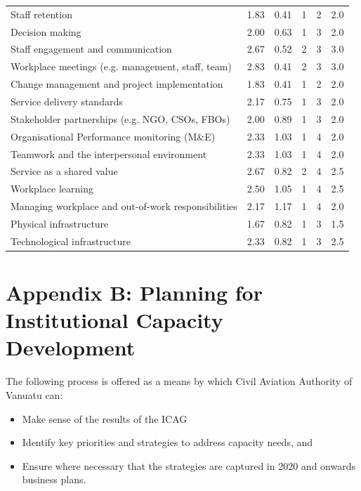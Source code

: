 \documentclass[
  10pt,
]{report}
\providecommand{\tightlist}{%
  \setlength{\itemsep}{0pt}\setlength{\parskip}{0pt}}
\begin{document}
\begin{longtable}[t]{>{\raggedright\arraybackslash}p{6cm}rrrrr}
Staff retention & 1.83 & 0.41 & 1 & 2 & 2.0\\
Decision making & 2.00 & 0.63 & 1 & 3 & 2.0\\
Staff engagement and communication & 2.67 & 0.52 & 2 & 3 & 3.0\\
\addlinespace
Workplace meetings (e.g. management, staff, team) & 2.83 & 0.41 & 2 & 3 & 3.0\\
Change management and project implementation & 1.83 & 0.41 & 1 & 2 & 2.0\\
Service delivery standards & 2.17 & 0.75 & 1 & 3 & 2.0\\
Stakeholder partnerships (e.g. NGO, CSOs, FBOs) & 2.00 & 0.89 & 1 & 3 & 2.0\\
Organisational Performance monitoring (M\&E) & 2.33 & 1.03 & 1 & 4 & 2.0\\
\addlinespace
Teamwork and the interpersonal environment & 2.33 & 1.03 & 1 & 4 & 2.0\\
Service as a shared value & 2.67 & 0.82 & 2 & 4 & 2.5\\
Workplace learning & 2.50 & 1.05 & 1 & 4 & 2.5\\
Managing workplace and out-of-work responsibilities & 2.17 & 1.17 & 1 & 4 & 2.0\\
Physical infrastructure & 1.67 & 0.82 & 1 & 3 & 1.5\\
\addlinespace
Technological infrastructure & 2.33 & 0.82 & 1 & 3 & 2.5\\
\bottomrule

\end{longtable}

\endgroup{}

\chapter{Appendix B: Planning for Institutional Capacity
Development}\label{appendix-b-planning-for-institutional-capacity-development}

The following process is offered as a means by which Civil Aviation
Authority of Vanuatu can:

\begin{itemize}
\tightlist
\item
  Make sense of the results of the ICAG
\item
  Identify key priorities and strategies to address capacity needs, and
\item
  Ensure where necessary that the strategies are captured in 2020 and
  onwards business plans.
\end{itemize}
\end{document}
